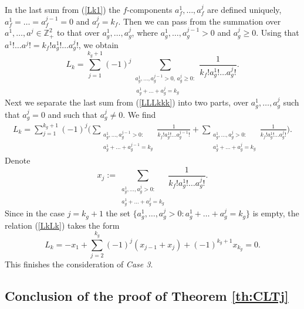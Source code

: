 \documentclass{article}
\numberwithin{equation}{section}
\newcommand{\mZ}{\mathbb{Z}}
\newcommand{\fr}{\frac}
\newcommand{\sli}{\sum\limits}
\newcommand{\lbl}{\label}
\newcommand{\bee}{\begin{equation}}
\newcommand{\eee}{\end{equation}}
\newcommand{\sck}{\substack}
\begin{document}
In the last sum from (\ref{Lk1})
the $f$-components $a^1_f,\ldots,a^j_f$ are defined uniquely,
$a^1_f=\ldots=a^{j-1}_f=0$ and $a^j_f=k_f$.
Then we can pass
from the summation over $a^1,\ldots,a^j\in\mZ^{2}_+$
to that over $a^1_g,\ldots, a^j_g$,
where $a^1_g,\ldots,a^{j-1}_g>0$
and $a_g^j\geq 0.$
Using that
$a^1!\ldots a^j!=k_f!a^1_g!\ldots a^j_g!$,
we obtain
\bee\lbl{LLLkkk}
L_k=
\sli_{j=1}^{k_g+1}
(-1)^{j}
\sli_{\sck{a^1_g,\ldots, a^{j-1}_g>0,\, a^j_g\geq 0: \\
\, a_g^1+\ldots+a_g^j=k_g }}
\fr{1}{k_f!a^1_g!\ldots a^j_g!}.
\eee
Next we separate the last sum from (\ref{LLLkkk}) into two parts,
over $a_g^1,\ldots,a_g^j$
such that $a^j_g=0$ and such that $a^j_g\neq 0$.
We find
\begin{align}\lbl{LkLk}
L_k=
\sli_{j=1}^{k_g+1}
(-1)^{j}
\Big(
\sli_{\sck{a^1_g,\ldots, a^{j-1}_g>0: \\ a^1_g+\ldots +a^{j-1}_g=k_g}}
\fr{1}{k_f!a^1_g!\ldots a^{j-1}_g!}
+\sli_{\sck{a^1_g,\ldots, a^j_g>0: \\ a^1_g+\ldots +a^{j}_g=k_g}}
\fr{1}{k_f!a^1_g!\ldots a^j_g!}
\Big).
\end{align}
Denote
$$
x_j:=\sli_{\sck{a^1_g,\ldots, a^j_g>0:\\  a^1_g+\ldots +a^{j}_g=k_g}}
\fr{1}{k_f!a^1_g!\ldots a^j_g!}.
$$
Since in the case $j=k_g+1$ the set
$\{a^1_g,\ldots, a^j_g>0: a^1_g+\ldots+a^j_g=k_g\}$ is empty,
the relation (\ref{LkLk}) takes the form
$$
L_k=-x_1+\sli_{j=2}^{k_g}(-1)^j(x_{j-1}+x_j)+(-1)^{k_g+1}x_{k_g}=0.
$$
This finishes the consideration of {\it Case 3}.



\subsection{Conclusion of the proof of Theorem \ref{th:CLTj}}
\end{document}
